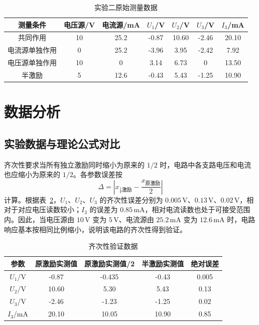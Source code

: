 \begin{table}[H]
    \centering
    \caption{实验二原始测量数据}
    \label{e2-tab:raw-data}
    \begin{tabular}{ccccccc}
        \toprule
        测量条件 & 电压源/V & 电流源/mA & \(U_1\)/V & \(U_2\)/V & \(U_3\)/V & \(I_3\)/mA \\
        \midrule
        共同作用 & 10 & 25.2 & -0.87 & 10.60 & -2.46 & 20.10 \\
        电流源单独作用 & 0 & 25.2 & -3.96 & 3.95 & -2.42 & 7.92 \\
        电压源单独作用 & 10 & 0 & 3.14 & 6.73 & 0 & 13.50 \\
        半激励 & 5 & 12.6 & -0.43 & 5.43 & -1.25 & 10.90 \\
        \bottomrule
    \end{tabular}
\end{table}

\section{数据分析}

\subsection{实验数据与理论公式对比}

齐次性要求当所有独立激励同时缩小为原来的 \(1/2\) 时，电路中各支路电压和电流也应缩小为原来的 \(1/2\)。各参数误差按
\begin{equation}
    \Delta=\left|x_{\frac{1}{2}\text{激励}}-\frac{x_{\text{原激励}}}{2}\right|
\end{equation}
计算。根据表~\ref{e2-tab:homogeneity}，\(U_1\)、\(U_2\)、\(U_3\) 的齐次性误差分别为 \(0.005\,\mathrm{V}\)、\(0.13\,\mathrm{V}\)、\(0.02\,\mathrm{V}\)，相对于对应电压读数较小；\(I_3\) 的误差为 \(0.85\,\mathrm{mA}\)，相对电流读数也处于可接受范围内。因此，当电压源由 \(10\,\mathrm{V}\) 变为 \(5\,\mathrm{V}\)、电流源由 \(25.2\,\mathrm{mA}\) 变为 \(12.6\,\mathrm{mA}\) 时，电路响应基本按相同比例缩小，说明该电路的齐次性得到验证。

\begin{table}[H]
    \centering
    \caption{齐次性验证数据}
    \label{e2-tab:homogeneity}
    \begin{tabular}{ccccc}
        \toprule
        参数 & 原激励实测值 & 原激励实测值/2 & 半激励实测值 & 绝对误差 \\
        \midrule
        \(U_1\)/V & -0.87 & -0.435 & -0.43 & 0.005 \\
        \(U_2\)/V & 10.60 & 5.30 & 5.43 & 0.13 \\
        \(U_3\)/V & -2.46 & -1.23 & -1.25 & 0.02 \\
        \(I_3\)/mA & 20.10 & 10.05 & 10.90 & 0.85 \\
        \bottomrule
    \end{tabular}
\end{table}

